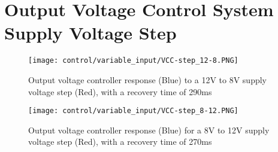 \section*{Output Voltage Control System Supply Voltage Step} \label{A:control_supply_step}

\begin{figure}[H]
    \begin{center}
        \texttt{[image: control/variable\_input/VCC-step\_12-8.PNG]}
        \caption{Output voltage controller response (Blue) to a 12V to 8V supply voltage step (Red), with a recovery time of 290ms}
    \end{center}
\end{figure}

\begin{figure}[H]
    \begin{center}
        \texttt{[image: control/variable\_input/VCC-step\_8-12.PNG]}
        \caption{Output voltage controller response (Blue) for a 8V to 12V supply voltage step (Red), with a recovery time of 270ms}
    \end{center}
\end{figure}